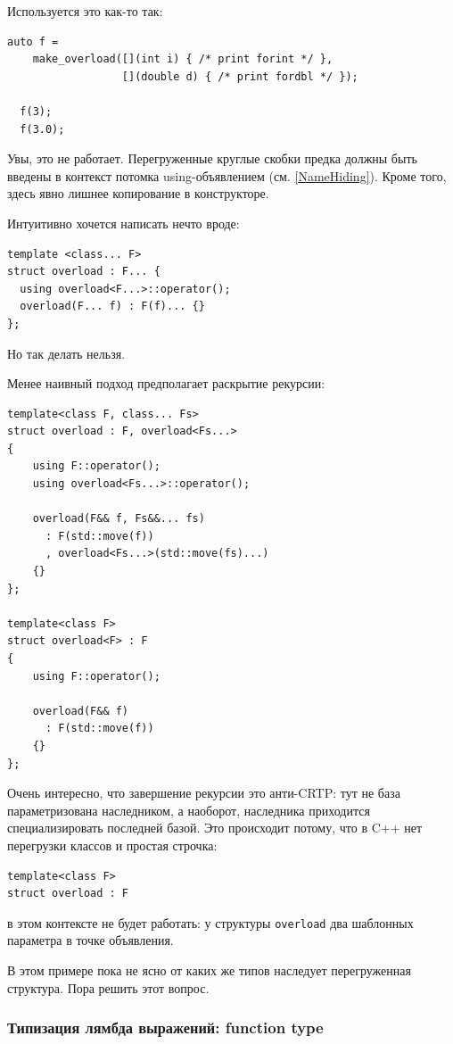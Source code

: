 \documentclass[a4paper,12pt,oneside]{article}
\begin{document}
Используется это как-то так:

\begin{lstlisting}
auto f =
    make_overload([](int i) { /* print forint */ },
                  [](double d) { /* print fordbl */ });

  f(3);
  f(3.0);
\end{lstlisting}

Увы, это не работает. Перегруженные круглые скобки предка должны быть введены в контекст потомка using-объявлением (см. \ref{NameHiding}). Кроме того, здесь явно лишнее копирование в конструкторе.

Интуитивно хочется написать нечто вроде:

\begin{lstlisting}
template <class... F>
struct overload : F... {
  using overload<F...>::operator();
  overload(F... f) : F(f)... {} 
};
\end{lstlisting}

Но так делать нельзя.

Менее наивный подход предполагает раскрытие рекурсии:

\begin{lstlisting}
template<class F, class... Fs>
struct overload : F, overload<Fs...>
{
    using F::operator();
    using overload<Fs...>::operator();

    overload(F&& f, Fs&&... fs)
      : F(std::move(f))
      , overload<Fs...>(std::move(fs)...)
    {}
};

template<class F>
struct overload<F> : F
{
    using F::operator();

    overload(F&& f)
      : F(std::move(f))
    {}
};
\end{lstlisting}

Очень интересно, что завершение рекурсии это анти-CRTP: тут не база параметризована наследником, а наоборот, наследника приходится специализировать последней базой. Это происходит потому, что в C++ нет перегрузки классов и простая строчка:

\begin{lstlisting}
template<class F>
struct overload : F
\end{lstlisting}

в этом контексте не будет работать: у структуры \lstinline!overload! два шаблонных параметра в точке объявления.

В этом примере пока не ясно от каких же типов наследует перегруженная структура. Пора решить этот вопрос.

\subsubsection{Типизация лямбда выражений: function type}\label{StdFunction}
\end{document}
